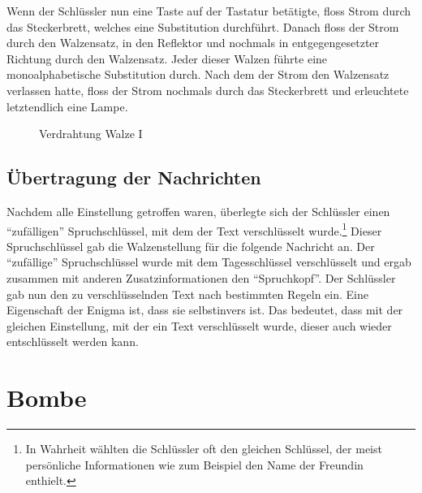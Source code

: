 \documentclass[ngerman, a4paper, footsepline, headsepline]{scrreport}
\begin{document}
		
	Wenn der Schlüssler nun eine Taste auf der Tastatur betätigte, floss Strom durch das Steckerbrett, welches eine Substitution durchführt. Danach floss der Strom durch den Walzensatz, in den Reflektor und nochmals in entgegengesetzter Richtung durch den Walzensatz. Jeder dieser Walzen führte eine monoalphabetische Substitution durch. Nach dem der Strom den Walzensatz verlassen hatte, floss der Strom nochmals durch das Steckerbrett und erleuchtete letztendlich eine Lampe.
	\begin{figure}[htbp]
		\centering
		\caption{Verdrahtung Walze I}
		\label{fig:rot1_cabeling}
	\end{figure}
	
	
	
	
	\section{Übertragung der Nachrichten}
	Nachdem alle Einstellung getroffen waren, überlegte sich der Schlüssler einen "`zufälligen"' Spruchschlüssel, mit dem der Text verschlüsselt wurde.\footnote{In Wahrheit wählten die Schlüssler oft den gleichen Schlüssel, der meist persönliche Informationen wie zum Beispiel den Name der Freundin enthielt.} Dieser Spruchschlüssel gab die Walzenstellung für die folgende Nachricht an. Der "`zufällige"' Spruchschlüssel wurde mit dem Tagesschlüssel verschlüsselt und ergab zusammen mit anderen Zusatzinformationen den "`Spruchkopf"'. Der Schlüssler gab nun den zu verschlüsselnden Text nach bestimmten Regeln ein. Eine Eigenschaft der Enigma ist, dass sie selbstinvers ist. Das bedeutet, dass mit der gleichen Einstellung, mit der ein Text verschlüsselt wurde, dieser auch wieder entschlüsselt werden kann.
	
	
	
	
	\chapter {Bombe}
	
\end{document}
